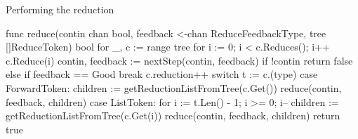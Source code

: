 \begin{listing}[ht]
\caption{Performing the reduction}
\label{lst:lin-reduce-strat-reduce}
\begin{gocode}
func reduce(contin chan bool, feedback <-chan ReduceFeedbackType, tree []ReduceToken) bool {
	for _, c := range tree {
		for i := 0; i < c.Reduces(); i++ {
			c.Reduce(i)
			contin, feedback := nextStep(contin, feedback)
			if !contin {
				return false
			} else if feedback == Good {
				break
			}
			c.reduction++
		}
		switch t := c.(type) {
		case ForwardToken:
			children := getReductionListFromTree(c.Get())
			reduce(contin, feedback, children)
		case ListToken:
			for i := t.Len() - 1; i >= 0; i-- {
				children := getReductionListFromTree(c.Get(i))
				reduce(contin, feedback, children)
			}
		}
	}
	return true
}
\end{gocode}
\end{listing}

